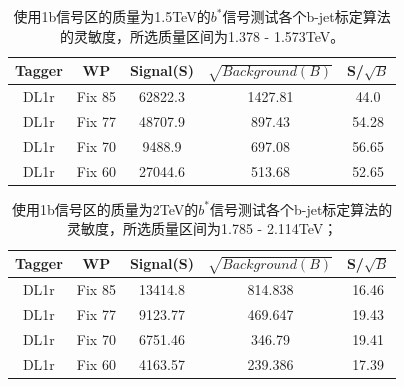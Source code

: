 \begin{table}[ht]
        \begin{center}
                \begin{tabular}{|c|c|c|c|c|}\hline
                        Tagger       & WP          & Signal(S)    & $\sqrt{Background(B)}$    & S/$\sqrt{B}$ \\\hline
                        DL1r          & Fix 85      & 62822.3       &   1427.81      & 44.0     \\
                        DL1r          & Fix 77      & 48707.9      &  897.43       &   54.28    \\
                        DL1r          & Fix 70      & 9488.9     &  697.08      &  56.65      \\
                        DL1r          & Fix 60      & 27044.6       &  513.68        & 52.65        \\
                        \hline
                \end{tabular}
        \end{center}
        \caption{使用1b信号区的质量为1.5TeV的$b^*$信号测试各个b-jet标定算法的灵敏度，所选质量区间为1.378 - 1.573TeV。}
        \label{tab:Sensbstar1p5TeV}
\end{table}%


\begin{table}[ht]
        \begin{center}
                \begin{tabular}{|c|c|c|c|c|}\hline
                        Tagger       & WP          & Signal(S)    & $\sqrt{Background(B)}$    & S/$\sqrt{B}$ \\\hline
                        DL1r          & Fix 85      & 13414.8      & 814.838        & 16.46       \\
                        DL1r          & Fix 77      & 9123.77      & 469.647       & 19.43    \\
                        DL1r          & Fix 70      & 6751.46      &  346.79       & 19.41       \\
                        DL1r          & Fix 60      & 4163.57     & 239.386         & 17.39    \\
                        \hline
                \end{tabular}
        \end{center}
        \caption{使用1b信号区的质量为2TeV的$b^*$信号测试各个b-jet标定算法的灵敏度，所选质量区间为1.785 - 2.114TeV；}
        \label{tab:Sensbstar2TeV}
\end{table}%

